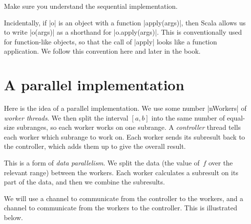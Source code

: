 \begin{instruction}
Make sure you understand the sequential implementation.
\end{instruction}

Incidentally, if |o| is an object with a function |apply(args)|, then Scala
allows us to write |o(args)| as a shorthand for |o.apply(args)|.  This is
conventionally used for function-like objects, so that the call of |apply|
looks like a function application.  We follow this convention here and later
in the book.


\section{A parallel implementation}

Here is the idea of a parallel implementation.  We use some number |nWorkers|
of \emph{worker threads}.  We then split the interval $[a,b]$ into the same
number of equal-size subranges, so each worker works on one subrange.  A
\emph{controller} thread tells each worker which subrange to work on.  Each
worker sends its subresult back to the controller, which adds them up to give
the overall result.

This is a form of \emph{data parallelism}.  We split the data (the value
of~$f$ over the relevant range) between the workers.  Each worker calculates a
subresult on its part of the data, and then we combine the subresults. 


We will use a channel  to communicate from the
controller to the workers, and a channel 
to communicate from the workers to the controller.  This is illustrated below.
%
\begin{center}
\end{center}

